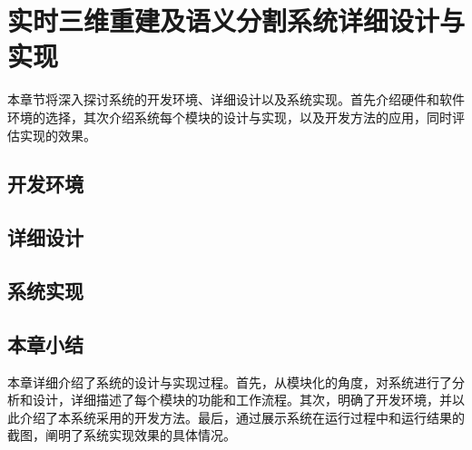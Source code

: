 \chapter{实时三维重建及语义分割系统详细设计与实现}

\par 本章节将深入探讨系统的开发环境、详细设计以及系统实现。首先介绍硬件和软件环境的选择，其次介绍系统每个模块的设计与实现，以及开发方法的应用，同时评估实现的效果。

\section{开发环境}


\section{详细设计}









\section{系统实现}


\section{本章小结}
\par 本章详细介绍了系统的设计与实现过程。首先，从模块化的角度，对系统进行了分析和设计，详细描述了每个模块的功能和工作流程。其次，明确了开发环境，并以此介绍了本系统采用的开发方法。最后，通过展示系统在运行过程中和运行结果的截图，阐明了系统实现效果的具体情况。